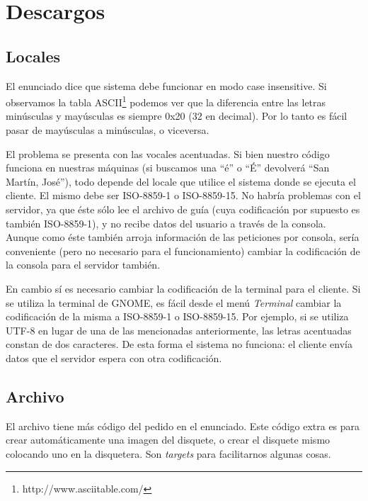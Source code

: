 \section{Descargos\label{sec:descargos}}

\subsection{Locales}
El enunciado dice que sistema debe funcionar en modo case insensitive. Si
observamos la tabla ASCII\footnote{http://www.asciitable.com/} podemos ver que
la diferencia entre las letras minúsculas y mayúsculas es siempre 0x20 (32 en
decimal). Por lo tanto es fácil pasar de mayúsculas a minúsculas, o viceversa.

El problema se presenta con las vocales acentuadas. Si bien nuestro código
funciona en nuestras máquinas (si buscamos una ``é'' o ``É'' devolverá ``San
Martín, José''), todo depende del locale que utilice el sistema donde se
ejecuta el cliente. El mismo debe ser ISO-8859-1 o ISO-8859-15. No habría
problemas con el servidor, ya que éste sólo lee el archivo de guía (cuya
codificación por supuesto es también ISO-8859-1), y no recibe datos del usuario
a través de la consola. Aunque como éste también arroja información de las
peticiones por consola, sería conveniente (pero no necesario para el
funcionamiento) cambiar la codificación de la consola para el servidor también.

En cambio sí es necesario cambiar la codificación de la terminal para el
cliente.  Si se utiliza la terminal de GNOME, es fácil desde el menú
\emph{Terminal} cambiar la codificación de la misma a ISO-8859-1 o ISO-8859-15.
Por ejemplo, si se utiliza UTF-8 en lugar de una de las mencionadas
anteriormente, las letras acentuadas constan de dos caracteres. De esta forma
el sistema no funciona: el cliente envía datos que el servidor espera con otra
codificación.

\subsection{Archivo }
El archivo  tiene más código del pedido en el enunciado. Este
código extra es para crear automáticamente una imagen del disquete, o crear el
disquete mismo colocando uno en la disquetera. Son \emph{targets} para
facilitarnos algunas cosas.

